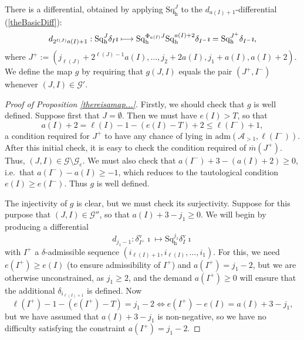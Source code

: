 \documentclass[11pt]{amsart} \renewcommand{\baselinestretch}{1.2}
\theoremstyle{plain}
\numberwithin{equation}{section} %
\theoremstyle{plain}
\numberwithin{equation}{chapter} %
\newcommand{\calA}{\mathcal{A}}
\newcommand{\calg}{\mathcal{G}}
\newcommand{\minDimP}{\overline{m}}
\newcommand{\LieSteen}{\calA}
\newcommand{\aS}[2][1]{\mathrm{adm}(\LieSteen_{>#1},#2)}
\newcommand{\uver}{^\mathrm{v}}
\newcommand{\dhor}{_\mathrm{h}}
\newcommand{\Sqh}{\mathrm{Sq}\dhor}
\newcommand{\deltav}{\delta\uver}
\renewcommand{\mapsto}{\longmapsto}
\begin{document}
\begin{The Bousfield-Kan spectral sequence for a sphere}
There is a differential, obtained by applying $\Sqh^J$ to the $d_{a(I)+1}$-differential (\ref{theBasicDiff}):
\[d_{2^{\ell (J)}a(I)+1}:\Sqh^J\delta_I\imath \mapsto  \Sqh^{\Phi_{\smash{a(I)}}J}\Sqh^{a(I)+2}\delta_{I^{-}}\imath= \Sqh^{J^{+}}\delta_{I^{-}}\imath ,\]
where $J^+:= (j_{\ell(J)}+2^{\ell(J)-1}a(I),\ldots,j_2+2a(I),j_1+a(I),a(I)+2)$.
We define the map $g$ by requiring that $g(J,I)$ equals the pair $(J^{+},I^-)$ whenever $(J,I)\in\calg'$.
\begin{proof}[Proof of Proposition \ref{thereisamap...}]
Firstly, we should check that $g$ is well defined. Suppose first that $J=\emptyset$. Then we must have $e(I)>T $, so that 
\[a(I)+2=\ell(I)-1-(e(I)-T)+2\leq \ell(I^-)+1,\]
a condition required for $J^+$ to have any chance of lying in $\aS{\ell (I^-)}$. After this initial check, it is easy to check the condition required of $\minDimP(J^{+})$. Thus, $(J,I)\in \calg\setminus \calg_e$. We must also check that $a(I^-)+3-(a(I)+2)\geq0$, i.e.\ that $a(I^-)-a(I)\geq -1$, which reduces to the tautological condition $e(I)\geq e(I^{-})$. Thus $g$ is well defined.

The injectivity of $g$ is clear, but we must check its surjectivity. Suppose for this purpose that $(J,I)\in\calg''$, so that $a(I)+3-j_1\geq 0$. We will begin by producing a differential
\[d_{j_1-1}:\deltav_{I^+}\imath\mapsto \Sqh^{j_1}\deltav_I\imath\]
with $I^{+}$ a $\delta$-admissible sequence $(i_{\ell(I)+1},i_{\ell(I)},\ldots,i_1)$. For this, we need $e(I^{+})\geq e(I)$ (to ensure admissibility of $I^+$) and $a(I^{+})=j_1-2$, but we are otherwise unconstrained, as $j_1\geq2$, and the demand $a(I^{+})\geq0$ will ensure that the additional $\delta_{i_{\ell(I)+1}}$ is defined. Now
\[\ell(I^{+})-1-(e(I^{+})-T)=j_1-2 \iff e(I^{+})-e(I)=a(I)+3-j_1,\]
but we have assumed that $a(I)+3-j_1$ is non-negative, so we have no difficulty satisfying  the constraint $a(I^{+})=j_1-2$.


\end{proof}
\end{The Bousfield-Kan spectral sequence for a sphere}
\end{document}
